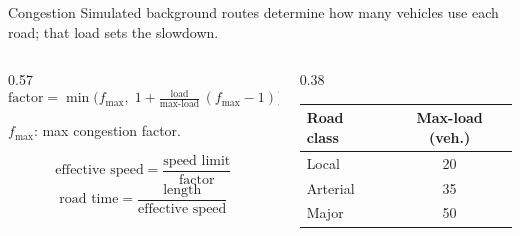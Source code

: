 \documentclass[aspectratio=169,10pt,t]{beamer}
\begin{document}
	\begin{frame}{Congestion}
	Simulated background routes determine how many vehicles use each road; that load sets the slowdown.
	\vfill
	\begin{columns}[c,onlytextwidth]
	\begin{column}{0.57\textwidth}
	\[
		\text{factor}=\min\!\Big(f_{\max},\;1+\tfrac{\text{load}}{\text{max-load}}\,(f_{\max}-1)\Big)
	\]
	\vspace{-0.5em}
	\begin{center}
		{\footnotesize\color{rMuted}\textbf{\(f_{\max}\)}: max congestion factor.}
	\end{center}
	\vspace{1.4em}
	\[
		\text{effective speed}=\frac{\text{speed limit}}{\text{factor}}
	\]
	\vspace{1.4em}
	\[
		\text{road time}=\frac{\text{length}}{\text{effective speed}}
	\]
	\end{column}
	\hfill
	\begin{column}{0.38\textwidth}
	\centering
	\renewcommand{\arraystretch}{1.35}
	\begin{tabular}{@{}l@{\hskip 1.2em}c@{}}
	\toprule
	\rowcolor{rPrimary!12}\textbf{Road class} & \textbf{Max-load (veh.)}\\
	\midrule
	Local & 20\\
	Arterial & 35\\
	Major & 50\\
	\bottomrule
	\end{tabular}
	\end{column}
	\end{columns}
	\vfill
	\end{frame}
	
\end{document}
